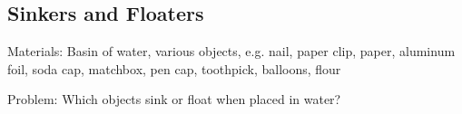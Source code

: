 \pagebreak


\subsection{Sinkers and Floaters} 


\begin{description*}
\item[Materials:]{Basin of water, various objects, e.g. nail, paper clip, paper, aluminum foil, soda cap, matchbox, pen cap, toothpick, balloons, flour}
\item[Problem:]{Which objects sink or float when placed in water?\\

}
\end{description*}
